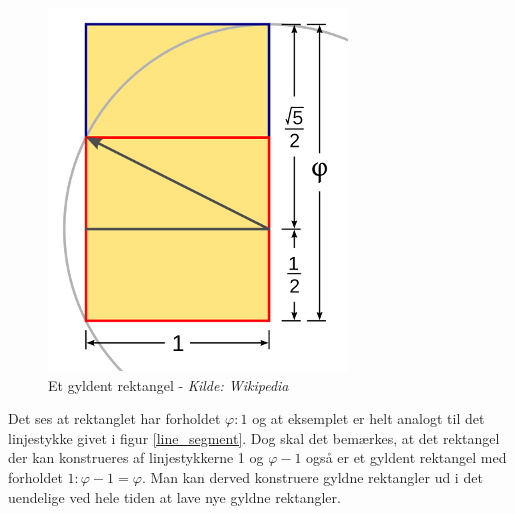 {\begin{figure}[h!]
	\begin{center}
		\includegraphics[scale=0.35,angle=0]{afsnit/baggrund/billeder/Golden_Rectangle_Construction}
	\end{center}
	\caption{Et gyldent rektangel - \emph{Kilde: Wikipedia}}
	\label{golden_rectangle}
\end{figure}
Det ses at rektanglet har forholdet $\varphi:1$ og at eksemplet er helt
analogt til det linjestykke givet i figur \ref{line_segment}. Dog skal
det bemærkes, at det rektangel der kan konstrueres af linjestykkerne 1
og $\varphi - 1$ også er et gyldent rektangel med forholdet $1:\varphi
-1 = \varphi$. Man kan derved konstruere gyldne rektangler ud i det
uendelige ved hele tiden at lave nye gyldne rektangler.

}
